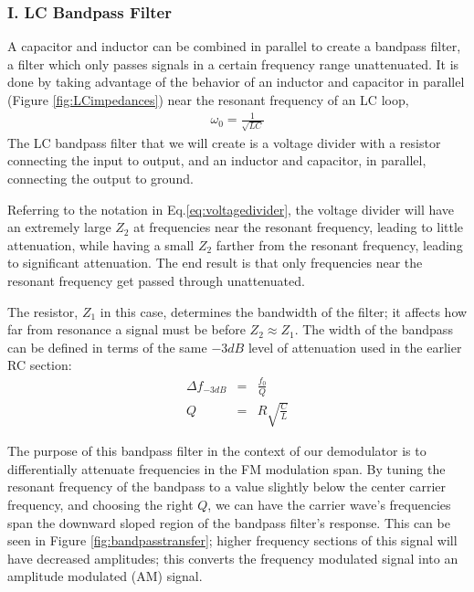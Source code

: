 \documentclass[12pt]{article}
\begin{document}
\subsubsection*{I. LC Bandpass Filter}
A capacitor and inductor can be combined in parallel to create a bandpass filter, a filter which only passes signals in a certain frequency range unattenuated. It is done by taking advantage of the behavior of an inductor and capacitor in parallel (Figure \ref{fig:LCimpedances}) near the resonant frequency of an LC loop,
\begin{eqnarray}
\omega_0 = \frac{1}{\sqrt{LC}} \label{eq:resonantfrequency}
\end{eqnarray}
The LC bandpass filter that we will create is a voltage divider with a resistor connecting the input to output, and an inductor and capacitor, in parallel, connecting the output to ground.

Referring to the notation in Eq.\ref{eq:voltagedivider}, the voltage divider will have an extremely large $Z_2$ at frequencies near the resonant frequency, leading to little attenuation, while having a small $Z_2$ farther from the resonant frequency, leading to significant attenuation. The end result is that only frequencies near the resonant frequency get passed through unattenuated.

The resistor, $Z_1$ in this case, determines the bandwidth of the filter; it affects how far from resonance a signal must be before $Z_2 \approx Z_1$. The width of the bandpass can be defined in terms of the same $-3dB$ level of attenuation used in the earlier RC section:
\begin{eqnarray}
\Delta{f}_{-3dB} &=& \frac{f_0}{Q}\label{eq:bandwidth}\\
Q &=& R\sqrt{\frac{C}{L}}\nonumber
\end{eqnarray}

The purpose of this bandpass filter in the context of our demodulator is to differentially attenuate frequencies in the FM modulation span. By tuning the resonant frequency of the bandpass to a value slightly below the center carrier frequency, and choosing the right $Q$, we can have the carrier wave's frequencies span the downward sloped region of the bandpass filter's response. This can be seen in Figure \ref{fig:bandpasstransfer}; higher frequency sections of this signal will have decreased amplitudes; this converts the frequency modulated signal into an amplitude modulated (AM) signal.
\end{document}

